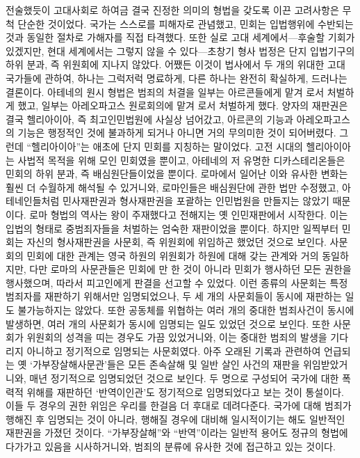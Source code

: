 전술했듯이
고대사회로 하여금 결국 진정한 의미의 형법을 갖도록 이끈
고려사항은 무척 단순한 것이었다.
국가는 스스로를 피해자로 관념했고,
민회는 입법행위에 수반되는 것과 동일한 절차로
가해자를 직접 타격했다.
또한 실로 고대 세계에서---후술할 기회가 있겠지만,
현대 세계에서는 그렇지 않을 수 있다---초창기 형사 법정은
단지 입법기구의 하위 분과, 즉 위원회에 지나지 않았다.
어쨌든 이것이
법사에서 두 개의 위대한 고대 국가들에 관하여,
하나는 그럭저럭 명료하게, 다른 하나는 완전히 확실하게,
드러나는 결론이다.
아테네의 원시 형법은 범죄의 처결을
일부는 아르콘들에게 맡겨
로서 처벌하게 했고,
일부는 아레오파고스 원로회의에 맡겨
로서 처벌하게 했다.
양자의 재판권은 결국 헬리아이아, 즉
최고인민법원에 사실상 넘어갔고,
아르콘의 기능과 아레오파고스의 기능은 행정적인 것에 불과하게 되거나
아니면 거의 무의미한 것이 되어버렸다.
그런데 ``헬리아이아''는 애초에 단지 민회를 지칭하는 말이었다.
고전 시대의 헬리아이아는 사법적 목적을 위해
모인 민회였을 뿐이고,
아테네의 저 유명한 디카스테리온들은
민회의 하위 분과, 즉 배심원단들이었을 뿐이다.
로마에서 일어난 이와 유사한 변화는
훨씬 더 수월하게 해석될 수 있거니와,
로마인들은 배심원단에 관한 법만 수정했고,
아테네인들처럼 민사재판권과 형사재판권을 포괄하는 인민법원을
만들지는 않았기 때문이다.
로마 형법의 역사는
왕이 주재했다고 전해지는
옛 인민재판에서 시작한다.
이는 입법의 형태로 중범죄자들을 처벌하는 엄숙한 재판이었을 뿐이다.
하지만
일찍부터
민회는 자신의 형사재판권을
사문회, 즉 위원회에
위임하곤 했었던 것으로 보인다.
사문회의 민회에 대한 관계는
영국 하원의 위원회가 하원에 대해 갖는 관계와 거의 동일하지만,
다만 로마의 사문관들은
민회에 만 한 것이 아니라
민회가 행사하던 모든 권한을 행사했으며,
따라서 피고인에게 판결을 선고할 수 있었다.
이런 종류의 사문회는
특정 범죄자를 재판하기 위해서만 임명되었으나,
두 세 개의 사문회들이 동시에 재판하는 일도 불가능하지는 않았다.
또한
공동체를 위협하는 여러 개의 중대한 범죄사건이 동시에 발생하면,
여러 개의 사문회가 동시에 임명되는 일도 있었던 것으로 보인다.
또한 사문회가
위원회의 성격을 띠는 경우도 가끔 있었거니와,
이는 중대한 범죄의 발생을 기다리지 아니하고
정기적으로 임명되는 사문회였다.
아주 오래된 기록과 관련하여 언급되는
옛 `가부장살해사문관'들은
모든 존속살해 및 일반 살인 사건의
재판을
위임받았거니와,
매년 정기적으로 임명되었던 것으로 보인다.
두 명으로 구성되어
국가에 대한 폭력적 위해를 재판하던
`반역이인관'도
정기적으로 임명되었다고 보는 것이 통설이다.
이들 두 경우의 권한 위임은 우리를 한걸음 더 후대로 데려다준다.
국가에 대해 범죄가  행해진 후 임명되는 것이 아니라,
 행해질 경우에 대비해
일시적이기는 해도 일반적인 재판권을 가졌던 것이다.
``가부장살해''와
``반역''이라는 일반적 용어도
정규의 형법에 다가가고 있음을 시사하거니와,
범죄의 분류에 유사한 것에 접근하고 있는 것이다.

